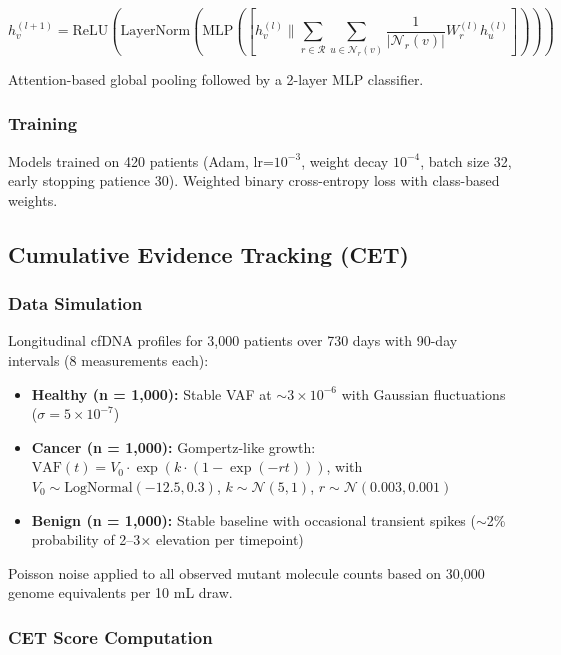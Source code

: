 \documentclass[10pt,a4paper]{article}
\begin{document}
\begin{equation}
h_v^{(l+1)} = \text{ReLU}\left(\text{LayerNorm}\left(\text{MLP}\left( \left[ h_v^{(l)} \| \sum_{r \in \mathcal{R}} \sum_{u \in \mathcal{N}_r(v)} \frac{1}{|\mathcal{N}_r(v)|} W_r^{(l)} h_u^{(l)} \right] \right)\right)\right)
\end{equation}

Attention-based global pooling followed by a 2-layer MLP classifier.

\subsubsection{Training}

Models trained on 420 patients (Adam, lr=$10^{-3}$, weight decay $10^{-4}$, batch size 32, early stopping patience 30). Weighted binary cross-entropy loss with class-based weights.

\subsection{Cumulative Evidence Tracking (CET)}

\subsubsection{Data Simulation}

Longitudinal cfDNA profiles for 3,000 patients over 730 days with 90-day intervals (8 measurements each):

\begin{itemize}
\item \textbf{Healthy (n = 1,000):} Stable VAF at $\sim 3 \times 10^{-6}$ with Gaussian fluctuations ($\sigma = 5 \times 10^{-7}$)
\item \textbf{Cancer (n = 1,000):} Gompertz-like growth: $\text{VAF}(t) = V_0 \cdot \exp(k \cdot (1 - \exp(-rt)))$, with $V_0 \sim \text{LogNormal}(-12.5, 0.3)$, $k \sim \mathcal{N}(5, 1)$, $r \sim \mathcal{N}(0.003, 0.001)$
\item \textbf{Benign (n = 1,000):} Stable baseline with occasional transient spikes ($\sim$2\% probability of 2--3$\times$ elevation per timepoint)
\end{itemize}

Poisson noise applied to all observed mutant molecule counts based on 30,000 genome equivalents per 10 mL draw.

\subsubsection{CET Score Computation}
\end{document}
